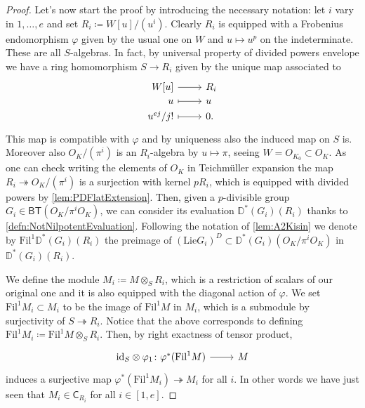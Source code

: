 \begin{proof}
Let's now start the proof by introducing the necessary notation:
let $i$ vary in $1, \ldots, e$ and set $R_i \coloneqq W[u]/ (u^i)$.
Clearly $R_i$ is equipped with a Frobenius endomorphism $\varphi$
given by the usual one on $W$ and $u \mapsto u^p$ on the indeterminate.
These are all $S$-algebras.
In fact, by universal property of divided powers envelope
we have a ring homomorphism $S \to R_i$ given by the unique map associated to
\begin{equation*}
\begin{tikzcd}[row sep = 0ex
	,/tikz/column 1/.append style={anchor=base east}
	,/tikz/column 2/.append style={anchor=base west}]
	W[u] \arrow[r, "", rightarrow] &
	R_i \\
	u \arrow[r, "", mapsto] & u \\
	u^{ej} / j!  \arrow[r, "", mapsto] & 0
.\end{tikzcd}
\end{equation*} 
This map is compatible with $\varphi$ and by uniqueness also
the induced map on $S$ is.
Moreover also $O_K/ (\pi^i)$ is an $R_i$-algebra by $u \mapsto \pi$,
seeing $W = O_{K_0} \subset O_K$.
As one can check writing the elements of $O_K$ in Teichmüller expansion
the map $R_i \twoheadrightarrow O_K/ (\pi^i)$ is a surjection
with kernel $pR_i$, which is equipped with divided powers by \cref{lem:PDFlatExtension}.
Then, given a $p$-divisible group $G_i \in \mathsf{BT}(O_K/\pi^iO_K)$,
we can consider its evaluation $\mathbb{D}^*(G_i)(R_i)$ thanks to \cref{defn:NotNilpotentEvaluation}.
Following the notation of \cref{lem:A2Kisin}
we denote by $\mathrm{Fil}^1\mathbb{D}^*(G_i)(R_i)$
the preimage of $\left( \mathrm{Lie}G_i \right)^D \subset \mathbb{D}^*(G_i)(O_K/\pi^iO_K)$
in $\mathbb{D}^*(G_i)(R_i)$.

We define the module $M_i \coloneqq M \otimes_S R_i$,
which is a restriction of scalars of our original one and
it is also equipped with the diagonal action of $\varphi$.
We set $\mathrm{Fil}^1 M_i \subset M_i$
to be the image of $\mathrm{Fil}^1 M$ in $M_i$, which is a submodule
by surjectivity of $S \twoheadrightarrow R_i$.
Notice that the above corresponds to defining $\mathrm{Fil}^1 M_i \coloneqq
\mathrm{Fil}^1 M \otimes_S R_i$.
Then, by right exactness of tensor product, 
\begin{equation*}
\begin{tikzcd}[row sep = 0ex
	,/tikz/column 1/.append style={anchor=base east}
	,/tikz/column 2/.append style={anchor=base west}]
	\mathrm{id}_{ S } \otimes \varphi_1
	\colon 
	\varphi^*(\mathrm{Fil}^1 M)\arrow[r, "", rightarrow] &
	M
\end{tikzcd}
\end{equation*} 
induces a surjective map $\varphi^*(\mathrm{Fil}^1 M_i) \twoheadrightarrow M_i$
for all $i$.
In other words we have just seen that
$M_i \in \mathsf{C}_{R_i}$ for all $i \in [1,e]$.


\end{proof}
